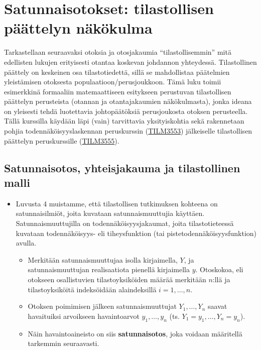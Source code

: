 \documentclass[
]{book}
\providecommand{\tightlist}{%
  \setlength{\itemsep}{0pt}\setlength{\parskip}{0pt}}
\begin{document}

\hypertarget{luku8}{%
\chapter{Satunnaisotokset: tilastollisen päättelyn näkökulma}\label{luku8}}

Tarkastellaan seuraavaksi otoksia ja otosjakaumia ``tilastollisemmin'' mitä edellisten lukujen erityisesti otantaa koskevan johdannon yhteydessä. Tilastollinen päättely on keskeinen osa tilastotiedettä, sillä se mahdollistaa päätelmien yleistämisen otoksesta populaatioon/perusjoukkoon. Tämä luku toimii esimerkkinä formaaliin matemaattiseen esitykseen perustuvan tilastollisen päättelyn perusteista (otannan ja otantajakaumien näkökulmasta), jonka ideana on yleisesti tehdä luotettavia johtopäätöksiä perusjoukosta otoksen perusteella. Tällä kurssilla käydään läpi (vain) tarvittavia yksityiskohtia sekä rakennetaan pohjia todennäköisyyslaskennan peruskurssin (\href{https://opas.peppi.utu.fi/fi/opintojakso/TILM3553/1734?period=2024-2027}{TILM3553}) jälkeiselle tilastollisen päättelyn peruskurssille (\href{https://opas.peppi.utu.fi/fi/opintojakso/TILM3555/1731?period=2024-2027}{TILM3555}).

\hypertarget{alaluku81}{%
\section{Satunnaisotos, yhteisjakauma ja tilastollinen malli}\label{alaluku81}}

\begin{itemize}
\tightlist
\item
  Luvusta 4 muistamme, että tilastollisen tutkimuksen kohteena on satunnaisilmiöt, joita kuvataan satunnaismuuttujia käyttäen. Satunnaismuuttujilla on todennäköisyysjakaumat, joita tilastotieteessä kuvataan todennäköisyys- eli tiheysfunktion (tai pistetodennäköisyysfunktion) avulla.

  \begin{itemize}
  \tightlist
  \item
    Merkitään satunnaismuuttujaa isolla kirjaimella, \(Y\), ja satunnaismuuttujan realisaatiota pienellä kirjaimella \(y\). Otoskokoa, eli otokseen osallistuvien tilastoyksiköiden määrää merkitään \(n\):llä ja tilastoyksiköitä indeksöidään alaindeksillä \(i=1,\ldots,n\).
  \item
    Otoksen poimimisen jälkeen satunnaismuuttujat \(Y_1, \ldots, Y_n\) saavat havaituiksi arvoikseen havaintoarvot \(y_1, \ldots, y_n\) (ts. \(Y_1=y_1, \ldots, Y_n = y_n\)).
  \item
    Näin havaintoaineisto on siis \textbf{satunnaisotos}, joka voidaan määritellä tarkemmin seuraavasti.
  \end{itemize}
\end{itemize}
\end{document}

